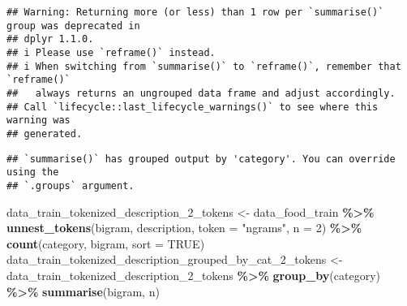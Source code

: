 \documentclass[
]{article}
\newenvironment{Shaded}{\begin{snugshade}}{\end{snugshade}}
\newcommand{\AttributeTok}[1]{\textcolor[rgb]{0.13,0.29,0.53}{#1}}
\newcommand{\CommentTok}[1]{\textcolor[rgb]{0.56,0.35,0.01}{\textit{#1}}}
\newcommand{\ConstantTok}[1]{\textcolor[rgb]{0.56,0.35,0.01}{#1}}
\newcommand{\DecValTok}[1]{\textcolor[rgb]{0.00,0.00,0.81}{#1}}
\newcommand{\FunctionTok}[1]{\textcolor[rgb]{0.13,0.29,0.53}{\textbf{#1}}}
\newcommand{\NormalTok}[1]{#1}
\newcommand{\OtherTok}[1]{\textcolor[rgb]{0.56,0.35,0.01}{#1}}
\newcommand{\SpecialCharTok}[1]{\textcolor[rgb]{0.81,0.36,0.00}{\textbf{#1}}}
\newcommand{\StringTok}[1]{\textcolor[rgb]{0.31,0.60,0.02}{#1}}
\begin{document}
\begin{verbatim}
## Warning: Returning more (or less) than 1 row per `summarise()` group was deprecated in
## dplyr 1.1.0.
## i Please use `reframe()` instead.
## i When switching from `summarise()` to `reframe()`, remember that `reframe()`
##   always returns an ungrouped data frame and adjust accordingly.
## Call `lifecycle::last_lifecycle_warnings()` to see where this warning was
## generated.
\end{verbatim}

\begin{verbatim}
## `summarise()` has grouped output by 'category'. You can override using the
## `.groups` argument.
\end{verbatim}

\begin{Shaded}
\end{Shaded}

\begin{Shaded}
\begin{Highlighting}[]
\NormalTok{data\_train\_tokenized\_description\_2\_tokens }\OtherTok{\textless{}{-}}\NormalTok{ data\_food\_train }\SpecialCharTok{\%\textgreater{}\%} \FunctionTok{unnest\_tokens}\NormalTok{(bigram, description, }\AttributeTok{token =} \StringTok{"ngrams"}\NormalTok{, }\AttributeTok{n =} \DecValTok{2}\NormalTok{) }\SpecialCharTok{\%\textgreater{}\%} \FunctionTok{count}\NormalTok{(category, bigram, }\AttributeTok{sort =} \ConstantTok{TRUE}\NormalTok{)}
\NormalTok{data\_train\_tokenized\_description\_grouped\_by\_cat\_2\_tokens }\OtherTok{\textless{}{-}}\NormalTok{ data\_train\_tokenized\_description\_2\_tokens }\SpecialCharTok{\%\textgreater{}\%} \FunctionTok{group\_by}\NormalTok{(category) }\SpecialCharTok{\%\textgreater{}\%} \FunctionTok{summarise}\NormalTok{(bigram, n)}
\end{Highlighting}
\end{Shaded}
\end{document}

